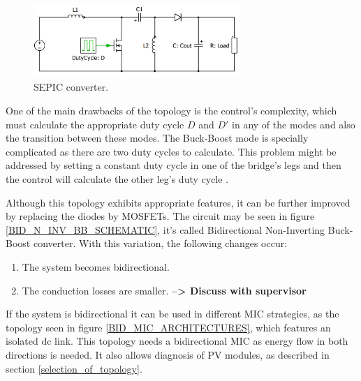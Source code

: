 \begin{figure}[htbp]
	\begin{center}
		\includegraphics[width=0.7\textwidth]{../Pictures/SEPIC}
		\caption{SEPIC converter.}
		\label{SEPIC_SCHEMATIC}
	\end{center}	
\end{figure}

One of the main drawbacks of the topology is the control's complexity, which must calculate the appropriate duty cycle $D$ and $D'$ in any of the modes and also the transition between these modes. The Buck-Boost mode is specially complicated as there are two duty cycles to calculate. This problem might be addressed by setting a constant duty cycle in one of the bridge's legs and then the control will calculate the other leg's duty cycle  \cite{AN4449_ST}.
		
Although this topology exhibits appropriate features, it can be further improved by replacing the diodes by MOSFETs. The circuit may be seen in figure \ref{BID_N_INV_BB_SCHEMATIC}, it's called Bidirectional Non-Inverting Buck-Boost converter. With this variation, the following changes occur:
		
\begin{enumerate}
	\item The system becomes bidirectional.
	\item The conduction losses are smaller. \textbf{--> Discuss with supervisor}
\end{enumerate}
	
If the system is bidirectional it can be used in different MIC strategies, as the topology seen in figure \ref{BID_MIC_ARCHITECTURES}, which features an isolated dc link. This topology needs a bidirectional MIC as energy flow in both directions is needed. It also allows diagnosis of PV modules, as described in section \ref{selection_of_topology}.

